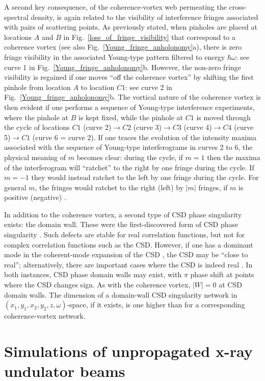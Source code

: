 \documentclass[%
 reprint,
 amsmath,amssymb,
 aps,
]{revtex4-1}
\begin{document}
A second key consequence, of the coherence-vortex web permeating the cross-spectral density, is again related to the visibility of interference fringes associated with pairs of scattering points.  As previously stated, when pinholes are placed at locations $A$ and $B$ in Fig.~\ref{loss_of_fringe_visibility} that correspond to a coherence vortex (see also Fig.~\ref{Young_fringe_anholonomy}a), there is zero fringe visibility in the associated Young-type pattern filtered to energy $\hbar \omega$: see curve 1 in Fig.~\ref{Young_fringe_anholonomy}b.  However, the non-zero fringe visibility is regained if one moves ``off the coherence vortex'' by shifting the first pinhole from location $A$ to location $C1$: see curve 2 in Fig.~\ref{Young_fringe_anholonomy}b.  The vortical nature of the coherence vortex is then evident if one performs a sequence of Young-type interference experiments, where the pinhole at $B$ is kept fixed, while the pinhole at $C1$ is moved through the cycle of locations $C1$ (curve 2)$\rightarrow C2$ (curve 3)$\rightarrow C3$ (curve 4)$\rightarrow C4$ (curve 5)$\rightarrow C1$ (curve 6 = curve 2). If one traces the evolution of the intensity maxima associated with the sequence of Young-type interferograms in curves 2 to 6, the physical meaning of $m$ becomes clear: during the cycle, if $m=1$ then the maxima of the interferogram will ``ratchet'' to the right by one fringe during the cycle. If $m=-1$ they would instead ratchet to the left by one fringe during the cycle.  For general $m$, the fringes would ratchet to the right (left) by $|m|$ fringes, if $m$ is positive (negative) \cite{Marasinghe2010}.

In addition to the coherence vortex, a second type of CSD phase singularity exists: the domain wall.  These were the first-discovered form of CSD phase singularity \cite{Schouten2003}.  Such defects are stable for real correlation functions, but not for complex correlation functions such as the CSD.  However, if one has a dominant mode in the coherent-mode expansion of the CSD \cite{mandel_wolf}, the CSD may be ``close to real''; alternatively, there are important cases where the CSD is indeed real \cite{Schouten2003}.  In both instances, CSD phase domain walls may exist, with $\pi$ phase shift at points where the CSD changes sign.  As with the coherence vortex, $|W|=0$ at CSD domain walls.  The dimension of a domain-wall CSD singularity network in $(x_1,y_1,x_2,y_2,z,\omega)$-space, if it exists, is one higher than for a corresponding coherence-vortex network.  

\section{Simulations of unpropagated x-ray undulator beams}
\end{document}
